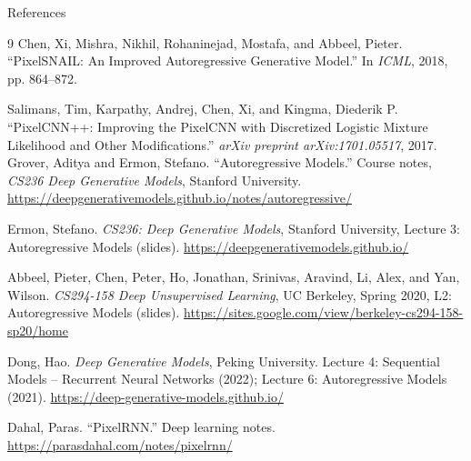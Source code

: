 \begin{frame}[allowframebreaks]{References}
\begin{thebibliography}{9}
Chen, Xi, Mishra, Nikhil, Rohaninejad, Mostafa, and Abbeel, Pieter. ``PixelSNAIL: An Improved Autoregressive Generative Model.'' In \emph{ICML}, 2018, pp. 864--872.

Salimans, Tim, Karpathy, Andrej, Chen, Xi, and Kingma, Diederik P. ``PixelCNN++: Improving the PixelCNN with Discretized Logistic Mixture Likelihood and Other Modifications.'' \emph{arXiv preprint arXiv:1701.05517}, 2017.
Grover, Aditya and Ermon, Stefano. ``Autoregressive Models.'' Course notes, \emph{CS236 Deep
Generative Models}, Stanford University. \url{https://deepgenerativemodels.github.io/notes/autoregressive/}

Ermon, Stefano. \emph{CS236: Deep Generative Models}, Stanford University, Lecture 3:
Autoregressive Models (slides). \url{https://deepgenerativemodels.github.io/}

Abbeel, Pieter, Chen, Peter, Ho, Jonathan, Srinivas, Aravind, Li, Alex, and Yan, Wilson.
\emph{CS294-158 Deep Unsupervised Learning}, UC Berkeley, Spring 2020, L2: Autoregressive Models
(slides). \url{https://sites.google.com/view/berkeley-cs294-158-sp20/home}

Dong, Hao. \emph{Deep Generative Models}, Peking University. Lecture 4: Sequential Models --
Recurrent Neural Networks (2022); Lecture 6: Autoregressive Models (2021).
\url{https://deep-generative-models.github.io/}

Dahal, Paras. ``PixelRNN.'' Deep learning notes. \url{https://parasdahal.com/notes/pixelrnn/}

\end{thebibliography}
\end{frame}

